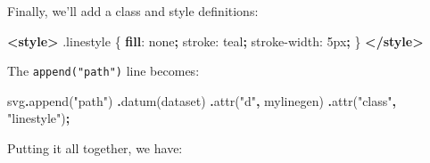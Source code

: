 \documentclass[
  openany]{book}
\newenvironment{Shaded}{\begin{snugshade}}{\end{snugshade}}
\newcommand{\ConstantTok}[1]{\textcolor[rgb]{0.00,0.00,0.00}{#1}}
\newcommand{\DataTypeTok}[1]{\textcolor[rgb]{0.13,0.29,0.53}{#1}}
\newcommand{\DecValTok}[1]{\textcolor[rgb]{0.00,0.00,0.81}{#1}}
\newcommand{\FunctionTok}[1]{\textcolor[rgb]{0.00,0.00,0.00}{#1}}
\newcommand{\KeywordTok}[1]{\textcolor[rgb]{0.13,0.29,0.53}{\textbf{#1}}}
\newcommand{\NormalTok}[1]{#1}
\newcommand{\OperatorTok}[1]{\textcolor[rgb]{0.81,0.36,0.00}{\textbf{#1}}}
\newcommand{\StringTok}[1]{\textcolor[rgb]{0.31,0.60,0.02}{#1}}
\begin{document}
Finally, we'll add a class and style definitions:

\begin{Shaded}
\begin{Highlighting}[]
\KeywordTok{\textless{}style\textgreater{}}
  \FunctionTok{.linestyle}\NormalTok{ \{}
    \KeywordTok{fill}\NormalTok{: }\DecValTok{none}\OperatorTok{;}
\NormalTok{    stroke: }\ConstantTok{teal}\OperatorTok{;}
\NormalTok{    stroke{-}width: }\DecValTok{5}\DataTypeTok{px}\OperatorTok{;}
\NormalTok{  \}}
\KeywordTok{\textless{}/style\textgreater{}}
\end{Highlighting}
\end{Shaded}

The \texttt{append("path")} line becomes:

\begin{Shaded}
\begin{Highlighting}[]
\NormalTok{svg}\OperatorTok{.}\FunctionTok{append}\NormalTok{(}\StringTok{"path"}\NormalTok{)}
    \OperatorTok{.}\FunctionTok{datum}\NormalTok{(dataset)}
    \OperatorTok{.}\FunctionTok{attr}\NormalTok{(}\StringTok{"d"}\OperatorTok{,}\NormalTok{ mylinegen)}
    \OperatorTok{.}\FunctionTok{attr}\NormalTok{(}\StringTok{"class"}\OperatorTok{,} \StringTok{"linestyle"}\NormalTok{)}\OperatorTok{;}
\end{Highlighting}
\end{Shaded}

Putting it all together, we have:
\end{document}
